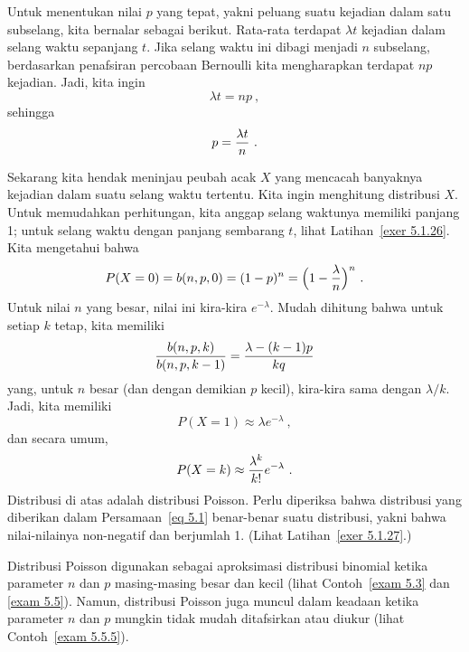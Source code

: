 \par Untuk menentukan nilai $p$ yang tepat, yakni peluang suatu kejadian dalam satu
subselang, kita bernalar sebagai berikut. Rata-rata terdapat $\lambda t$ kejadian dalam
selang waktu sepanjang $t$. Jika selang waktu ini dibagi menjadi $n$ subselang, berdasarkan
penafsiran percobaan Bernoulli kita mengharapkan terdapat $np$ kejadian. Jadi, kita ingin
$$\lambda t = n p\ ,$$ sehingga
$$p = {{\lambda t}\over{n}}\ .$$
\par Sekarang kita hendak meninjau peubah acak $X$ yang mencacah banyaknya kejadian dalam
suatu selang waktu tertentu. Kita ingin menghitung distribusi $X$. Untuk memudahkan
perhitungan, kita anggap selang waktunya memiliki panjang 1; untuk selang waktu dengan
panjang sembarang $t$, lihat Latihan~\ref{exer 5.1.26}. Kita mengetahui bahwa
$$P(X = 0) = b(n, p, 0) = (1 - p)^n = \Bigl(1 - {\lambda \over n}\Bigr)^n\ .$$ Untuk
nilai $n$ yang besar, nilai ini kira-kira $e^{-\lambda}$. Mudah dihitung bahwa untuk
setiap $k$ tetap, kita memiliki
$${{b(n, p, k)}\over{b(n, p, k-1)}} = {{\lambda - (k-1)p}\over{kq}}$$ yang, untuk $n$
besar (dan dengan demikian $p$ kecil), kira-kira sama dengan $\lambda/k$. Jadi, kita
memiliki
$$P(X = 1) \approx \lambda e^{-\lambda}\ ,$$ dan secara umum,
\begin{equation} P(X = k) \approx {{\lambda^k}\over{k!}} e^{-\lambda}\ .\label{eq 5.1}
\end{equation} Distribusi di atas adalah distribusi Poisson. Perlu diperiksa bahwa
distribusi yang diberikan dalam Persamaan~\ref{eq 5.1} benar-benar 
suatu distribusi, yakni bahwa nilai-nilainya non-negatif dan berjumlah 1. (Lihat
Latihan~\ref{exer 5.1.27}.)
\par Distribusi Poisson digunakan sebagai aproksimasi distribusi binomial ketika
parameter $n$ dan $p$ masing-masing besar dan kecil (lihat Contoh~\ref{exam 5.3} dan
\ref{exam 5.5}). Namun, distribusi Poisson juga muncul dalam keadaan ketika parameter
$n$ dan $p$ mungkin tidak mudah ditafsirkan atau diukur (lihat Contoh~\ref{exam 5.5.5}).

